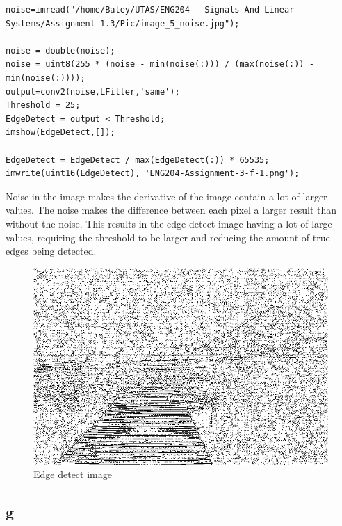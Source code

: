 \documentclass[11pt]{article}
\begin{document}
\begin{verbatim}
noise=imread("/home/Baley/UTAS/ENG204 - Signals And Linear Systems/Assignment 1.3/Pic/image_5_noise.jpg");

noise = double(noise);
noise = uint8(255 * (noise - min(noise(:))) / (max(noise(:)) - min(noise(:))));
output=conv2(noise,LFilter,'same');
Threshold = 25;
EdgeDetect = output < Threshold;
imshow(EdgeDetect,[]);

EdgeDetect = EdgeDetect / max(EdgeDetect(:)) * 65535;
imwrite(uint16(EdgeDetect), 'ENG204-Assignment-3-f-1.png');
\end{verbatim}
Noise in the image makes the derivative of the image contain a lot of larger values. The noise makes the difference between each pixel a larger result than without the noise. This results in the edge detect image having a lot of large values, requiring the threshold to be larger and reducing the amount of true edges being detected.
\begin{FIGURE}
\begin{figure}[H]
\centering
\includegraphics[width=.9\linewidth]{ENG204-Assignment-3-f-1.png}
\caption{Edge detect image}
\end{figure}
\end{FIGURE}
\subsection{g}
\label{sec:orga915e23}
\end{document}
